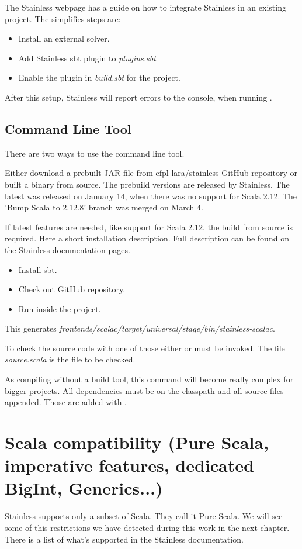 The Stainless webpage has a guide on how to integrate Stainless in an existing project.
The simplifies steps are:
\begin{itemize}
  \item Install an external solver.
  \item Add Stainless sbt plugin to \emph{plugins.sbt}
  \item Enable the plugin in \emph{build.sbt} for the project.
\end{itemize}
After this setup, Stainless will report errors to the console, when running .

\subsection{Command Line Tool}
There are two ways to use the command line tool.

Either download a prebuilt JAR file from efpl-lara/stainless GitHub repository or built a binary from source.
The prebuild versions are released by Stainless.
The latest was released on January 14, when there was no support for Scala 2.12.
The 'Bump Scala to 2.12.8' branch was merged on March 4.

If latest features are needed, like support for Scala 2.12, the build from source is required.
Here a short installation description.
Full description can be found on the Stainless documentation pages.
\begin{itemize}
  \item Install sbt.
  \item Check out GitHub repository.
  \item Run  inside the project.
\end{itemize}
This generates \emph{frontends/scalac/target/universal/stage/bin/stainless-scalac}.

To check the source code with one of those either  or  must be invoked.
The file \emph{source.scala} is the file to be checked.

As compiling without a build tool, this command will become really complex for bigger projects.
All dependencies must be on the classpath and all source files appended.
Those are added with .

\section{Scala compatibility (Pure Scala, imperative features, dedicated BigInt, Generics...)}
Stainless supports only a subset of Scala.
They call it Pure Scala.
We will see some of this restrictions we have detected during this work in the next chapter.
There is a list of what's supported in the Stainless documentation.
